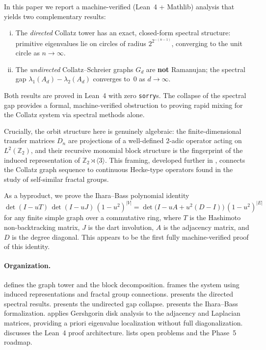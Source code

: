 \documentclass[12pt]{article}
\newcommand{\Z}{\mathbb{Z}}
\newcommand{\card}[1]{\left\lvert #1 \right\rvert}
\DeclareMathOperator{\det}{det}
\begin{document}
In this paper we report a machine-verified (Lean~4 + Mathlib) analysis
that yields two complementary results:
\begin{enumerate}[(i)]
  \item The \emph{directed} Collatz tower has an exact, closed-form
    spectral structure: primitive eigenvalues lie on circles of radius
    $2^{2^{-(n-1)}}$, converging to the unit circle as $n \to \infty$.
  \item The \emph{undirected} Collatz--Schreier graphs $G_d$ are
    \textbf{not} Ramanujan; the spectral gap $\lambda_1(A_d) -
    \lambda_2(A_d)$ converges to~$0$ as $d \to \infty$.
\end{enumerate}
Both results are proved in Lean~4 with zero \texttt{sorry}s.  The
collapse of the spectral gap provides a formal, machine-verified
obstruction to proving rapid mixing for the Collatz system via spectral
methods alone.

Crucially, the orbit structure here is genuinely algebraic: the finite-dimensional transfer matrices $D_n$ are projections of a well-defined $2$-adic operator acting on $L^2(\Z_2)$, and their recursive monomial block structure is the fingerprint of the induced representation of $\Z_2 \rtimes \langle 3 \rangle$. This framing, developed further in , connects the Collatz graph sequence to continuous Hecke-type operators found in the study of self-similar fractal groups.

As a byproduct, we prove the Ihara--Bass polynomial identity
\[
  \det(I - uT)\,\det(I - uJ)\,(1-u^2)^{\card{V}}
  = \det\!\bigl(I - uA + u^2(D - I)\bigr)\,(1-u^2)^{\card{E}}
\]
for any finite simple graph over a commutative ring, where $T$ is the
Hashimoto non-backtracking matrix, $J$ is the dart involution,
$A$ is the adjacency matrix, and $D$ is the degree diagonal.
This appears to be the first fully machine-verified proof of this
identity.

\paragraph{Organization.}
 defines the graph tower and the block decomposition.
 frames the system using induced representations and fractal group connections.
 presents the directed spectral results.
 presents the undirected gap collapse.
 presents the Ihara--Bass formalization.
 applies Gershgorin disk analysis to the
adjacency and Laplacian matrices, providing a priori eigenvalue
localization without full diagonalization.
 discusses the Lean~4 proof architecture.
 lists open problems and the Phase~5 roadmap.
\end{document}
